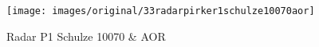 \begin{figure}[!h] 
\centering 
\texttt{[image: images/original/33radarpirker1schulze10070aor]}
\caption{Radar P1 Schulze 10070 & AOR}
\label{fig:33radarpirker1schulze10070aor} 
\end{figure}

